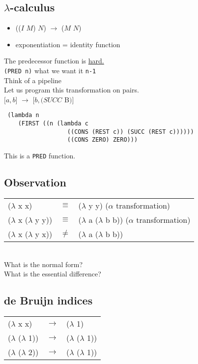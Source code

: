 \documentclass{article}
\begin{document}
\subsection*{$\lambda$-calculus}
\begin{flushleft}
  \begin{itemize}
   \item[] (($\mathit{I}$ $\mathit{M}$) $\mathit{N}$) $\rightarrow$ ($\mathit{M}$ $\mathit{N}$)
   \item[] exponentiation = identity function
  \end{itemize}
The predecessor function is \underline{hard.}\\
\verb|(PRED n)| what we want it \verb|n-1|\\
Think of a pipeline\\
\bigskip
Let us program this transformation on pairs.\\
$\mathit{[} \mathit{a,b} \mathit{]}$  $\rightarrow$ $\mathit{[} \mathit{b, (SUCC}$ B$) \mathit{]}$

\begin{verbatim}
 (lambda n
    (FIRST ((n (lambda c
                  ((CONS (REST c)) (SUCC (REST c))))))
                  ((CONS ZERO) ZERO)))
\end{verbatim}
This is a \verb|PRED| function.\\
\pagebreak
\subsection*{Observation}
\begin{tabular}{l c l}
 ($\lambda$ x x)		& $\equiv$ & ($\lambda$ y y) ($\alpha$ transformation)\\
 ($\lambda$ x ($\lambda$ y y))	& $\equiv$ & ($\lambda$ a ($\lambda$ b b)) ($\alpha$ transformation)\\
 ($\lambda$ x ($\lambda$ y x))	& $\neq$   & ($\lambda$ a ($\lambda$ b b))\\
\end{tabular}
\bigskip
\\What is the normal form?\\
What is the essential difference?\\
\end{flushleft}
\bigskip
\begin{flushleft}
\subsection*{de Bruijn indices}
\begin{tabular}{l c l}
  ($\lambda$ x x)		& $\rightarrow$		& ($\lambda$ 1)\\
  ($\lambda$ ($\lambda$ 1))	& $\rightarrow$		& ($\lambda$ ($\lambda$ 1))\\
  ($\lambda$ ($\lambda$ 2))	& $\rightarrow$		& ($\lambda$ ($\lambda$ 1))\\
\end{tabular}

\end{flushleft}
\end{document}
